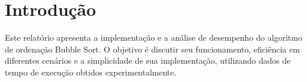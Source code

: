 \documentclass{article}
\begin{document}




\newpage
\section{Introdução}
Este relatório apresenta a implementação e a análise de desempenho do algoritmo de ordenação Bubble Sort. O objetivo é discutir seu funcionamento, eficiência em diferentes cenários e a simplicidade de sua implementação, utilizando dados de tempo de execução obtidos experimentalmente.


\end{document}
